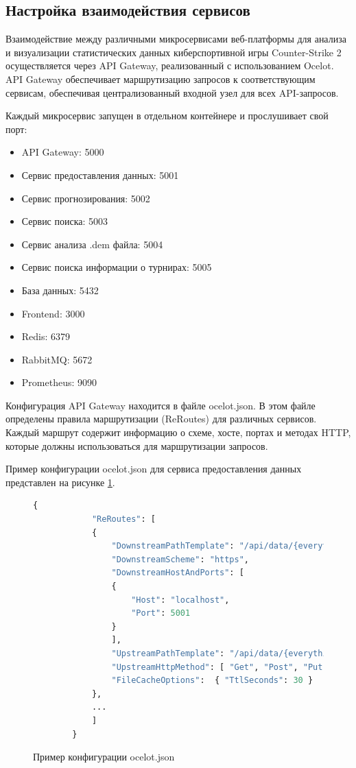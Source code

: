 \subsection{Настройка взаимодействия сервисов}

Взаимодействие между различными микросервисами веб-платформы для анализа и визуализации статистических данных киберспортивной игры Counter-Strike 2 осуществляется через API Gateway, реализованный с использованием Ocelot. API Gateway обеспечивает маршрутизацию запросов к соответствующим сервисам, обеспечивая централизованный входной узел для всех API-запросов.

Каждый микросервис запущен в отдельном контейнере и прослушивает свой порт:

\begin{itemize}
	\item API Gateway: 5000
	\item Сервис предоставления данных: 5001
	\item Сервис прогнозирования: 5002
	\item Сервис поиска: 5003
	\item Сервис анализа .dem файла: 5004
	\item Сервис поиска информации о турнирах: 5005
	\item База данных: 5432
	\item Frontend: 3000
	\item Redis: 6379
	\item RabbitMQ: 5672
	\item Prometheus: 9090
\end{itemize}

Конфигурация API Gateway находится в файле ocelot.json. В этом файле определены правила маршрутизации (ReRoutes) для различных сервисов. Каждый маршрут содержит информацию о схеме, хосте, портах и методах HTTP, которые должны использоваться для маршрутизации запросов.

Пример конфигурации ocelot.json для сервиса предоставления данных представлен на рисунке \ref{list:ocelot}.

\begin{figure}
	\begin{lstlisting}[language=Python]
		{
			"ReRoutes": [
			{
				"DownstreamPathTemplate": "/api/data/{everything}",
				"DownstreamScheme": "https",
				"DownstreamHostAndPorts": [
				{
					"Host": "localhost",
					"Port": 5001
				}
				],
				"UpstreamPathTemplate": "/api/data/{everything}",
				"UpstreamHttpMethod": [ "Get", "Post", "Put", "Delete" ],
				"FileCacheOptions":  { "TtlSeconds": 30 }
			},
			...
			]
		}
	\end{lstlisting}
	\caption{Пример конфигурации ocelot.json}
	\label{list:ocelot}
\end{figure}

